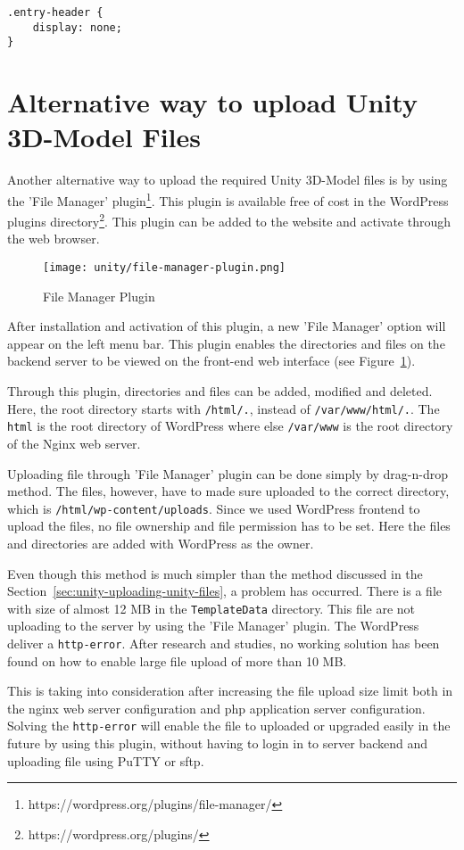 \begin{lstlisting}
.entry-header {
	display: none;
}
\end{lstlisting}

\section{Alternative way to upload Unity 3D-Model Files}
Another alternative way to upload the required Unity 3D-Model files is by using the 'File Manager' plugin\footnote{https://wordpress.org/plugins/file-manager/}. This plugin is available free of cost in the WordPress plugins directory\footnote{https://wordpress.org/plugins/}. This plugin can be added to the website and activate through the web browser.

\begin{figure}[ht]
\caption{File Manager Plugin}
\label{fig:file-manager-screen}
\centering
\texttt{[image: unity/file-manager-plugin.png]}
\end{figure}

After installation and activation of this plugin, a new 'File Manager' option will appear on the left menu bar. This plugin enables the directories and files on the backend server to be viewed on the front-end web interface (see Figure~\ref{fig:file-manager-screen}).

Through this plugin, directories and files can be added, modified and deleted. Here, the root directory starts with \texttt{/html/.}, instead of \texttt{/var/www/html/.}. The \texttt{html} is the root directory of WordPress where else \texttt{/var/www} is the root directory of the Nginx web server.

Uploading file through 'File Manager' plugin can be done simply by drag-n-drop method. The files, however, have to made sure uploaded to the correct directory, which is \texttt{/html/wp-content/uploads}. Since we used WordPress frontend to upload the files, no file ownership and file permission has to be set. Here the files and directories are added with WordPress as the owner.

Even though this method is much simpler than the method discussed in the Section~\ref{sec:unity-uploading-unity-files}, a problem has occurred. There is a file with size of almost 12 MB in the \texttt{TemplateData} directory. This file are not uploading to the server by using the 'File Manager' plugin. The WordPress deliver a \texttt{http-error}. After research and studies, no working solution has been found on how to enable large file upload of more than 10 MB.

This is taking into consideration after increasing the file upload size limit both in the \ac{nginx} web server configuration and \ac{php} application server configuration. Solving the \texttt{http-error} will enable the file to uploaded or upgraded easily in the future by using this plugin, without having to login in to server backend and uploading file using PuTTY or \ac{sftp}.
